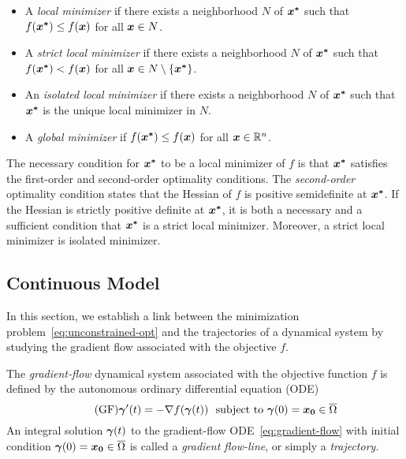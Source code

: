 \documentclass[10pt]{article}
\begin{document}
        \begin{itemize}
            \item A \emph{local minimizer} if there exists a neighborhood $N$ of $\bm{x^*}$ such that 
            $f(\bm{x^*}) \leq f(\bm{x})$ for all $\bm{x} \in N$.
            \item A \emph{strict local minimizer} if there exists a neighborhood $N$ of $\bm{x^*}$ 
            such that $f(\bm{x^*}) < f(\bm{x})$ for all $\bm{x} \in N \setminus \{\bm{x^*}\}$.
            \item An \emph{isolated local minimizer} if there exists a neighborhood $N$ of 
            $\bm{x^*}$ such that $\bm{x^*}$ is the unique local minimizer in $N$.
            \item A \emph{global minimizer} if $f(\bm{x^*}) \leq f(\bm{x})$ for all $\bm{x} \in \mathbb{R}^n$.
        \end{itemize}

        The necessary condition for $\bm{x^*}$ to be a local minimizer of $f$ is that 
        $\bm{x^*}$ satisfies the first-order and second-order optimality conditions.
        The \emph{second-order} optimality condition states that the Hessian of $f$ 
        is positive semidefinite at $\bm{x^*}$. If the Hessian is strictly positive
        definite at $\bm{x^*}$, it is both a necessary and a sufficient condition that $\bm{x^*}$
        is a strict local minimizer. Moreover, a strict local minimizer is isolated minimizer.

        \bigskip
    
    
    \subsection{Continuous Model}
        \label{intro:grad-flow}
        
        \medskip

        In this section, we establish a link between the minimization problem~\eqref{eq:unconstrained-opt} and the 
        trajectories of a dynamical system by studying the gradient flow associated with the objective $f$.

        \medskip

        \begin{definition}
            \label{def:grad-flow}
            The \emph{gradient‐flow} dynamical system associated with the objective function $f$ 
            is defined by the autonomous ordinary differential equation (ODE)
            \begin{equation}
                \label{eq:gradient-flow}\tag{GF}
                \bm{\gamma}'(t) = -\nabla f(\bm{\gamma}(t)) ~\text{ subject to } \bm{\gamma}(0) = \bm{x_0} \in \overline{\Omega}
            \end{equation}
            An integral solution $\bm{\gamma}(t)$ to the gradient-flow ODE~\eqref{eq:gradient-flow} with initial condition
            $\bm{\gamma}(0) = \bm{x_0} \in \overline{\Omega}$ is called a \emph{gradient flow-line}, or simply a \emph{trajectory}.
        \end{definition}
\end{document}
